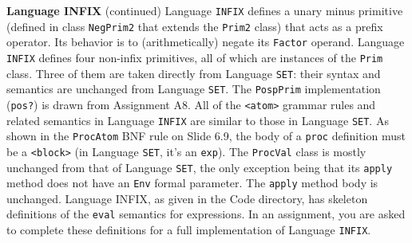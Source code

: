 \begin{minipage}[t]{\sw}
\slidenumber
\LARGE
{\bf Language INFIX} (continued)\exx
Language \verb'INFIX' defines a unary minus primitive
(defined in class \verb'NegPrim2' that extends the \verb'Prim2' class)
that acts as a prefix operator.
Its behavior is to (arithmetically) negate its \verb'Factor' operand.\exx
Language \verb'INFIX' defines four non-infix primitives,
all of which are instances of the \verb'Prim' class.
Three of them are taken directly from Language \verb'SET':
their syntax and semantics are unchanged from Language \verb'SET'.
The \verb'PospPrim' implementation (\verb'pos?')
is drawn from Assignment A8.\exx
All of the \verb'<atom>' grammar rules
and related semantics in Language \verb'INFIX' are similar
to those in Language \verb'SET'.
As shown in the \verb'ProcAtom' BNF rule on Slide 6.9,
the body of a \verb'proc' definition must be a \verb'<block>'
(in Language \verb'SET', it's an \verb'exp').
The \verb'ProcVal' class is mostly unchanged
from that of Language \verb'SET',
the only exception being that its \verb'apply' method
does not have an \verb'Env' formal parameter.
The \verb'apply' method body is unchanged.\exx
Language INFIX, as given in the Code directory,
has skeleton definitions of the \verb'eval' semantics for expressions.
In an assignment, you are asked to complete these definitions
for a full implementation of Language \verb'INFIX'.
\end{minipage}
